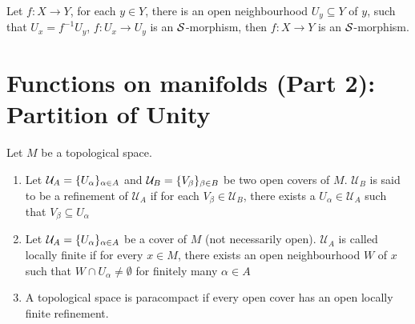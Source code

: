 \begin{remark}
	Let $f: X \to Y$, for each $y \in Y$, there is an open neighbourhood $U_y \subseteq Y$ of $y$, such that $U_x =  f^{-1} U_y$, $f: U_x \to U_y$ is an $\mathcal{S}$-morphism, then $f: X \to Y$ is an $\mathcal{S}$-morphism.
\end{remark}



\section{Functions on manifolds (Part 2): Partition of Unity}

\begin{definition}
	Let $M$ be a topological space. 
	
	\begin{enumerate}
		\item Let $\mathcal{U}_A = \{U_\alpha\}_{\alpha \in A}$ and $\mathcal{U}_B = \{V_\beta\}_{\beta \in B}$ be two open covers of $M$. $\mathcal{U}_B$ is said to be a refinement of $\mathcal{U}_A$ if for each $V_\beta \in \mathcal{U}_B$, there exists a $U_\alpha \in \mathcal{U}_A$ such that $V_\beta \subseteq U_\alpha$
		
		\item Let $\mathcal{U}_A = \{U_\alpha\}_{\alpha \in A}$ be a cover of $M$ (not necessarily open). $\mathcal{U}_A$ is called locally finite if for every $x \in M$, there exists an open neighbourhood $W$ of $x$ such that $W \cap U_\alpha \neq \emptyset$ for finitely many $\alpha \in A$
		
		\item A topological space is paracompact if every open cover has an open locally finite refinement.
	\end{enumerate}
\end{definition}

